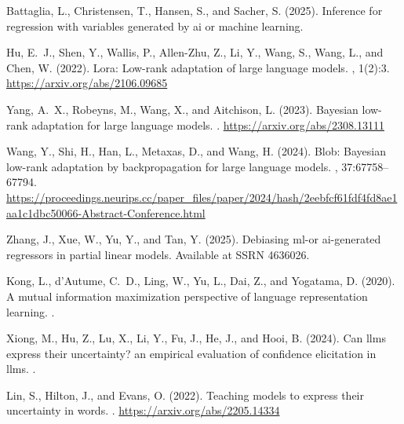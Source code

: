 \documentclass[11pt]{article}
\begin{document}
\newpage

\begin{thebibliography}{99}

Battaglia, L., Christensen, T., Hansen, S., and Sacher, S. (2025).
\newblock Inference for regression with variables generated by ai or machine learning.

Hu, E.~J., Shen, Y., Wallis, P., Allen-Zhu, Z., Li, Y., Wang, S., Wang, L., and Chen, W. (2022).
\newblock Lora: Low-rank adaptation of large language models.
, 1(2):3.
\newblock \url{https://arxiv.org/abs/2106.09685}

Yang, A.~X., Robeyns, M., Wang, X., and Aitchison, L. (2023).
\newblock Bayesian low-rank adaptation for large language models.
.
\newblock \url{https://arxiv.org/abs/2308.13111}

Wang, Y., Shi, H., Han, L., Metaxas, D., and Wang, H. (2024).
\newblock Blob: Bayesian low-rank adaptation by backpropagation for large language models.
, 37:67758--67794.
\newblock \url{https://proceedings.neurips.cc/paper_files/paper/2024/hash/2eebfcf61fdf4fd8ae1aa1c1dbc50066-Abstract-Conference.html}

Zhang, J., Xue, W., Yu, Y., and Tan, Y. (2025).
\newblock Debiasing ml-or ai-generated regressors in partial linear models.
\newblock Available at SSRN 4636026.

Kong, L., d'Autume, C.~D., Ling, W., Yu, L., Dai, Z., and Yogatama, D. (2020).
\newblock A mutual information maximization perspective of language representation learning.
.

Xiong, M., Hu, Z., Lu, X., Li, Y., Fu, J., He, J., and Hooi, B. (2024).
\newblock Can llms express their uncertainty? an empirical evaluation of confidence elicitation in llms.
.

Lin, S., Hilton, J., and Evans, O. (2022).
\newblock Teaching models to express their uncertainty in words.
.
\newblock \url{https://arxiv.org/abs/2205.14334}

\end{thebibliography}
\end{document}
